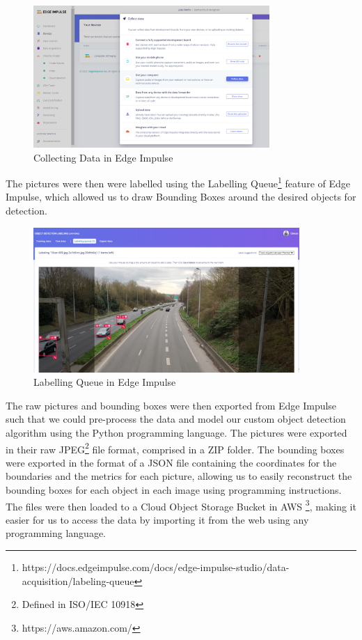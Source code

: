 \documentclass[openright]{normas-utf-tex} %
\begin{document}
\begin{figure}[H]
	\centering
	\includegraphics[width=0.8\textwidth]{./images/edge-impulse-collect-data.png}
	\caption[Collecting Data in Edge Impulse]{Collecting Data in Edge Impulse}
    \label{fig:diff}
\end{figure}

The pictures were then were labelled using the Labelling Queue\footnote{https://docs.edgeimpulse.com/docs/edge-impulse-studio/data-acquisition/labeling-queue}
feature of Edge Impulse, which allowed us to draw Bounding Boxes around the desired objects for detection.

\begin{figure}[H]
	\centering
	\includegraphics[width=0.9\textwidth]{./images/edge-impulse-labelling-queue.png}
	\caption[Labelling Queue in Edge Impulse]{Labelling Queue in Edge Impulse}
    \label{fig:diff}
\end{figure}

The raw pictures and bounding boxes were then exported from Edge Impulse such
that we could pre-process the data and model our custom object detection
algorithm using the Python programming language. The pictures were exported in
their raw JPEG\footnote{Defined in ISO/IEC 10918}  file format, comprised in a
ZIP folder. The bounding boxes were exported in the format of a JSON file
containing the coordinates for the boundaries and the metrics for each picture,
allowing us to easily reconstruct the bounding boxes for each object in each
image using programming instructions. The files were then loaded to a Cloud
Object Storage Bucket in AWS \footnote{https://aws.amazon.com/}, making it
easier for us to access the data by importing it from the web using any
programming language.
\end{document}
